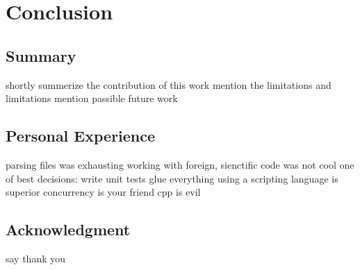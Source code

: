 \chapter{Conclusion}
\section{Summary}
shortly summerize the contribution of this work
mention the limitations and limitations
mention passible future work

\section{Personal Experience}
parsing files was exhausting
working with foreign, sienctific code was not cool
one of best decisions: write unit tests
glue everything using a scripting language is superior
concurrency is your friend
cpp is evil

\section{Acknowledgment}
say thank you